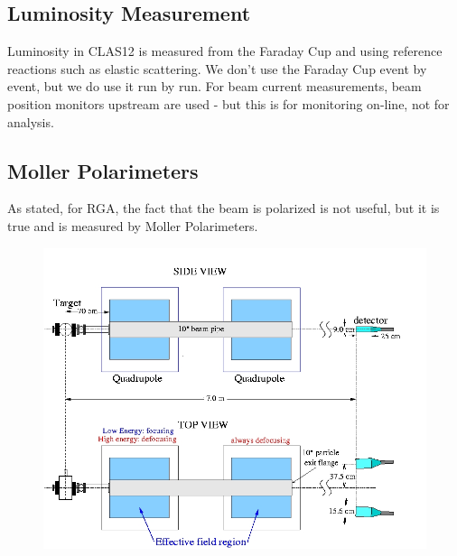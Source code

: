         \subsection{Luminosity Measurement}
            Luminosity in CLAS12 is measured from the Faraday Cup and using reference reactions such as elastic scattering. We don't use the Faraday Cup event by event, but we do use it run by run. For beam current measurements, beam position monitors upstream are used - but this is for monitoring on-line, not for analysis.
        \subsection{Moller Polarimeters}
            As stated, for RGA, the fact that the beam is polarized is not useful, but it is true and is measured by Moller Polarimeters. 
        
            \begin{figure}[H]
    			\centering
    			\includegraphics[width=12cm]{CLAS-12/modules/clas-12-system/pics/other/hall-b-poll-1.jpg}
    			\caption{ }
			\end{figure}
			
